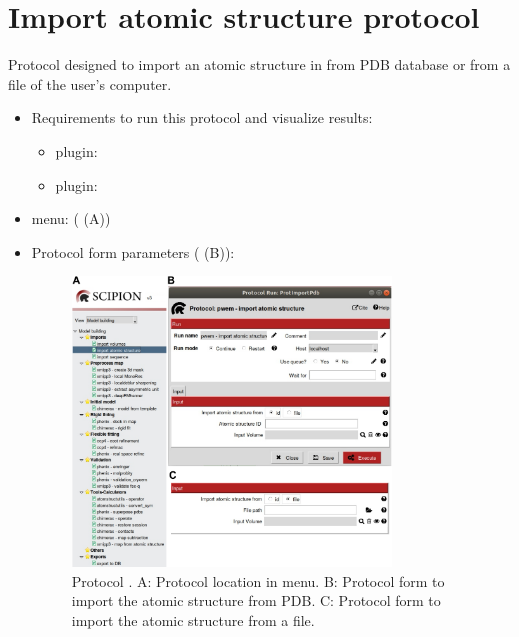 \section{Import atomic structure protocol}
\label{app:importAtomicStructure}%
Protocol designed to import an atomic structure in \scipion from PDB database or from a file of the user's computer.
   
 \begin{itemize}
  \item Requirements to run this protocol and visualize results:
    \begin{itemize}
        \item \scipion plugin: 
        \item \scipion plugin: 
    \end{itemize}
  \item \scipion menu:
   ( (A))
  
  \item Protocol form parameters ( (B)):
  
  \begin{figure}[H]
    \centering 
    \captionsetup{width=.7\linewidth} 
    \includegraphics[width=0.80\textwidth]{Images_appendix/Fig110.pdf}
    \caption{Protocol . A: Protocol location in \scipion menu. B: Protocol form to import the atomic structure from PDB. C: Protocol form to import the atomic structure from a file.}
    \label{fig:app_protocol_atomicStructure_1}
   \end{figure}


\end{itemize}
